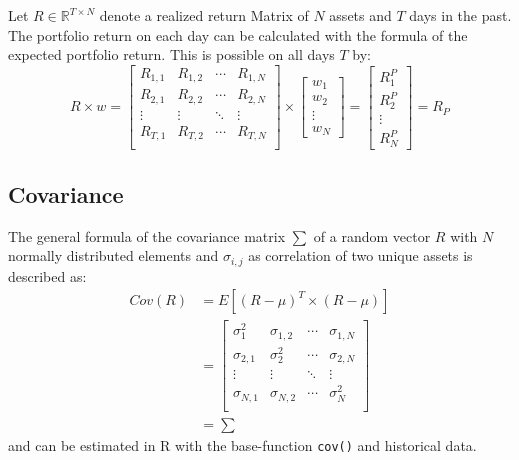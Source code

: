 \documentclass[
  oneside]{book}
\begin{document}
Let \(R \in \mathbb{R}^{T \times N}\) denote a realized return Matrix of \(N\) assets and \(T\) days in the past. The portfolio return on each day can be calculated with the formula of the expected portfolio return. This is possible on all days \(T\) by:
\[
  R \times w = 
  \begin{bmatrix}
    R_{1, 1} & R_{1, 2} & \cdots & R_{1, N} \\
    R_{2, 1} & R_{2, 2} & \cdots & R_{2, N} \\
    \vdots  & \vdots & \ddots & \vdots \\
    R_{T, 1} & R_{T, 2} & \cdots & R_{T, N} \\
 \end{bmatrix}
  \times 
  \begin{bmatrix}
    w_{1} \\ 
    w_{2} \\
    \vdots \\
    w_{N}  
 \end{bmatrix}
 =
   \begin{bmatrix}
    R_{1}^P \\ 
    R_{2}^P \\
    \vdots \\
    R_{N}^P  
 \end{bmatrix}
 =
 R_P
\]

\hypertarget{covariance}{%
\subsection{Covariance}\label{covariance}}

The general formula of the covariance matrix \(\textstyle\sum\) of a random vector \(R\) with \(N\) normally distributed elements and \(\sigma_{i,j}\) as correlation of two unique assets is described as:
\begin{align*}
  Cov(R) &= E[(R-\mu)^T \times (R-\mu)] \\
  &=   \begin{bmatrix}
    \sigma_1^2 & \sigma_{1,2} & \cdots & \sigma_{1,N} \\
    \sigma_{2, 1} & \sigma_2^2 & \cdots & \sigma_{2, N} \\
    \vdots  & \vdots & \ddots & \vdots \\
    \sigma_{N, 1} & \sigma_{N, 2} & \cdots & \sigma_N^2 \\
 \end{bmatrix}\\
  &=\textstyle\sum
\end{align*}
and can be estimated in R with the base-function \texttt{cov()} and historical data.
\end{document}
